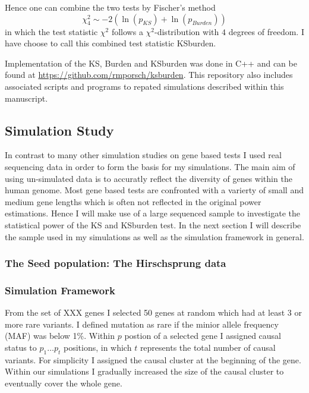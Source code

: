 Hence one can combine the two tests by Fischer's method 
\begin{equation}
	\chi^2_4 \sim - 2 (\ln(p_{KS}) + \ln(p_{Burden}))
\end{equation}
in which the test statistic $\chi^2$ follows a $\chi^2$-distribution with $4$ degrees of freedom.
I have choose to call this combined test statistic KSburden.

Implementation of the KS, Burden and KSburden was done in C++ and can be found at \url{https://github.com/rmporsch/ksburden}.
This repository also includes associated scripts and programs to repated simulations described within this manuscript.

\subsection{Simulation Study}
\label{sub:simulation_study}

In contrast to many other simulation studies on gene based tests I used real sequencing data in order to form the basis for my simulations.
The main aim of using un-simulated data is to accuratly reflect the diversity of genes within the human genome.
Most gene based tests are confronted with a varierty of small and medium gene lengths which is often not reflected in the original power estimations.
Hence I will make use of a large sequenced sample to investigate the statistical power of the KS and KSburden test.
In the next section I will describe the sample used in my simulations as well as the simulation framework in general.

\subsubsection{The Seed population: The Hirschsprung data}
\label{ssub:The_Seed_population:_The_Hirschsprung_data}

\subsubsection{Simulation Framework}
\label{ssub:Simulation_Framework}

From the set of XXX genes I selected 50 genes at random which had at least 3 or more rare variants. 
I defined mutation as rare if the minior allele frequency (MAF) was below 1\%. 
Within $p$ postion of a selected gene I assigned causal status to $p_1 \ldots p_t$ positions, in which $t$ represents the total number of causal variants.
For simplicity I assigned the causal cluster at the beginning of the gene.
Within our simulations I gradually increased the size of the causal cluster to eventually cover the whole gene. 

